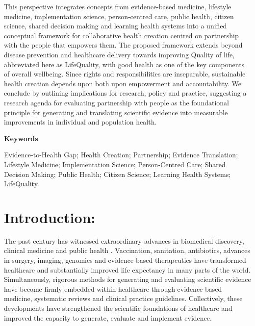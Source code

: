 \documentclass{article}
\begin{document}
This perspective integrates concepts from evidence-based medicine, lifestyle medicine, implementation science, person-centred care, public health, citizen science, shared decision making and learning health systems into a unified conceptual framework for collaborative health creation centred on partnership with the people that empowers them. The proposed framework extends beyond disease prevention and healthcare delivery towards improving Quality of life, abbreviated here as LifeQuality, with good health as one of the key components of overall wellbeing. Since rights and responsibilities are inseparable, sustainable health creation depends upon both upon empowerment and accountability. We conclude by outlining implications for research, policy and practice, suggesting a research agenda for evaluating partnership with people as the foundational principle for generating and translating scientific evidence into measurable improvements in individual and population health.

\textbf{\textbf{Keywords}}

Evidence-to-Health Gap; Health Creation; Partnership; Evidence Translation; Lifestyle Medicine; Implementation Science; Person-Centred Care; Shared Decision Making; Public Health; Citizen Science; Learning Health Systems; LifeQuality.
\section{Introduction:}
\label{sec:org839bba0}
The past century has witnessed extraordinary advances in biomedical discovery, clinical medicine and public health \cite{IOM2001} \cite{WHO2025} . Vaccination, sanitation, antibiotics, advances in surgery, imaging, genomics and evidence-based therapeutics have transformed healthcare \cite{WHO2025}  and substantially improved life expectancy in many parts of the world. Simultaneously, rigorous methods for generating and evaluating scientific evidence have become firmly embedded within healthcare through evidence-based medicine, systematic reviews and clinical practice guidelines. \cite{Greenhalgh2011} Collectively, these developments have strengthened the scientific foundations of healthcare and improved the capacity to generate, evaluate and implement evidence.
\end{document}
